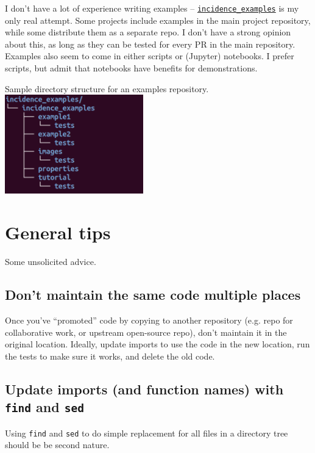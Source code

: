 \documentclass{article}
\begin{document}
I don't have a lot of experience writing examples --
\href{https://github.com/Robbybp/incidence_examples}{\texttt{incidence\_examples}}
is my only real attempt. Some projects include examples in the main project
repository, while some distribute them as a separate repo.
I don't have a strong opinion about this, as long as they can be tested
for every PR in the main repository.
Examples also seem to come in either scripts or (Jupyter) notebooks.
I prefer scripts, but admit that notebooks have benefits for demonstrations.

\begin{center}
  Sample directory structure for an examples repository.\\
  \includegraphics[width=6cm]{incidence_examples_tree_small}
\end{center}

\section{General tips}
Some unsolicited advice.

\subsection{Don't maintain the same code multiple places}
Once you've ``promoted'' code by copying to another repository
(e.g. repo for collaborative work, or upstream open-source repo),
don't maintain it in the original location.
Ideally, update imports to use the code in the new location,
run the tests to make sure it works, and delete the old code.

\subsection{Update imports (and function names) with
\texttt{find} and \texttt{sed}}
Using \texttt{find} and \texttt{sed} to do simple replacement
for all files in a directory tree should be be second nature.
\end{document}
